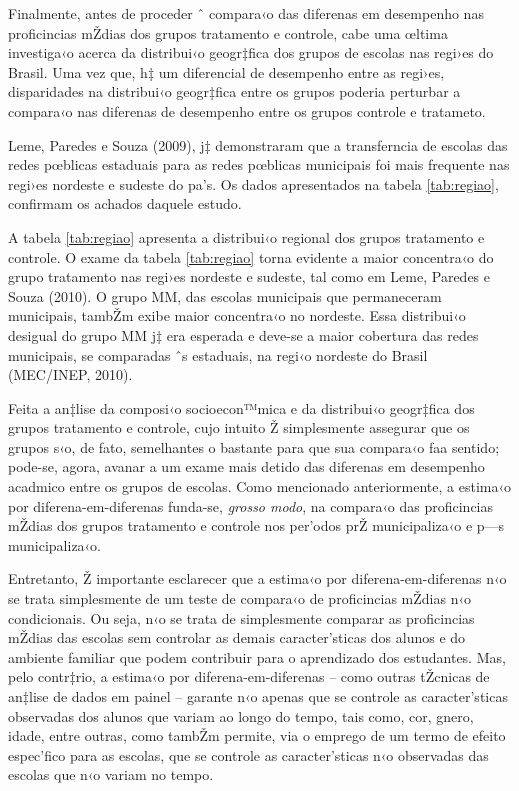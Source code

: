 \documentclass[a4paper, 12pt]{article}
\begin{document}
Finalmente, antes de proceder  ˆ compara‹o das diferenas em desempenho nas proficincias mŽdias dos grupos tratamento e controle, cabe uma œltima investiga‹o acerca da distribui‹o geogr‡fica dos grupos de escolas nas regi›es do Brasil. Uma vez que, h‡ um diferencial de desempenho entre as regi›es, disparidades na distribui‹o geogr‡fica entre os grupos poderia perturbar a compara‹o nas diferenas de desempenho entre os grupos controle e tratameto.

Leme, Paredes e Souza (2009), j‡ demonstraram que a transferncia de escolas das redes pœblicas estaduais para as redes pœblicas municipais foi mais frequente nas regi›es nordeste e sudeste do pa’s. Os dados apresentados na tabela \ref{tab:regiao}, confirmam os achados daquele estudo.



                             

A tabela \ref{tab:regiao} apresenta a distribui‹o regional dos grupos tratamento e controle. O exame da tabela  \ref{tab:regiao} torna evidente a maior concentra‹o do grupo tratamento nas regi›es nordeste e sudeste, tal como em Leme, Paredes e Souza (2010). O grupo MM, das escolas municipais que permaneceram municipais, tambŽm exibe maior concentra‹o no nordeste. Essa distribui‹o desigual do grupo MM j‡ era esperada e deve-se a maior cobertura das redes municipais, se comparadas ˆs estaduais, na regi‹o nordeste do Brasil (MEC/INEP, 2010). 


Feita a an‡lise da composi‹o socioecon™mica e da distribui‹o geogr‡fica dos grupos tratamento e controle, cujo intuito Ž simplesmente assegurar que os grupos s‹o, de fato, semelhantes o bastante para que sua compara‹o faa sentido; pode-se, agora, avanar a um exame mais detido das diferenas em desempenho acadmico entre os grupos de escolas. Como mencionado anteriormente, a estima‹o por diferena-em-diferenas funda-se, \emph{grosso modo}, na compara‹o das proficincias mŽdias dos grupos tratamento e controle nos per’odos prŽ municipaliza‹o e p—s municipaliza‹o.

Entretanto, Ž importante esclarecer que a estima‹o por diferena-em-diferenas n‹o se trata simplesmente de um teste de compara‹o de proficincias mŽdias n‹o condicionais. Ou seja, n‹o se trata de simplesmente comparar as proficincias mŽdias das escolas sem controlar as demais caracter’sticas dos alunos e do ambiente familiar que podem contribuir para o aprendizado dos estudantes. Mas, pelo contr‡rio, a estima‹o por diferena-em-diferenas -- como outras tŽcnicas de an‡lise de dados em painel --  garante n‹o apenas que se controle as caracter’sticas observadas dos alunos que variam ao longo do tempo, tais como, cor, gnero, idade, entre outras, como tambŽm permite, via o emprego de um termo de efeito espec’fico para as escolas, que se controle as caracter’sticas n‹o observadas das escolas que n‹o variam no tempo. 
\end{document}
